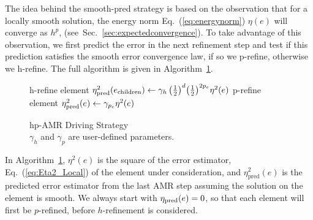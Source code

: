 The idea behind the smooth-pred strategy is based on the observation that for a locally smooth solution, the
energy norm Eq.~(\ref{eq:energynorm}) $\eta(e)$ will converge as
$h^{p}$, (see~Sec.~\ref{sec:expectedconvergence}).  To take advantage of this observation, we first predict the error in the next refinement step and test if this prediction satisfies the smooth error convergence law, if so we p-refine, otherwise we h-refine. The full algorithm is given in Algorithm~\ref{alg:hpamr}.

\begin{figure}
  \begin{algorithm}[H]
    \caption{\label{alg:hpamr}
      hp-AMR Driving Strategy\\
      $\gamma_{h}$ and $\gamma_{p}$ are user-defined parameters.
    }
    \begin{algorithmic}[1]
           \State h-refine element
          \State $\eta^2_{\rm pred}(e_{\textrm{children}}) \gets \gamma_{h}\,\big(\frac{1}{2}\big)^{d}\big(\frac{1}{2}\big)^{2p_e}\eta^{2}(e)$
          \Else
                     \State p-refine element
          \State $\eta^2_{\rm pred}(e) \gets \gamma_{p_e}\eta^2(e)$
          \EndIf
        \EndIf
      \EndProcedure
    \end{algorithmic}
  \end{algorithm}
\end{figure}

In Algorithm~\ref{alg:hpamr}, $\eta^2(e)$ is the square of the error
estimator, Eq.~(\ref{eq:Eta2_Local}) of the element under
  consideration, and $\eta_{\text{pred}}^2(e)$ is the predicted error
  estimator from the last AMR step assuming the solution on the
  element is smooth. We always start with $\eta_{\rm pred}(e)=0$, so that
  each element will first be $p$-refined, before $h$-refinement is
  considered.

